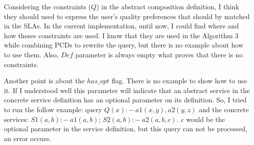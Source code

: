 \documentclass[12pt,a4paper,oneside]{report}
\begin{document}
\bigskip
Considering the constraints ($Q$) in the abstract composition definition, I think they should used to express the user's quality preferences that should by matched in the SLAs. In the current implementation, until now, I could find where and how theses constraints are used. I know that they are used in the Algorithm 3~\cite{ba} while combining PCDs to rewrite the query, but there is no example about how to use them. Also, \textbf{$Def$} parameter is always empty what proves that there is no constraints.

\bigskip
Another point is about the $has\_opt$ flag. There is no example to show how to use it. If I understood well this parameter will indicate that an abstract service in the concrete service definition has an optional parameter on its definition. So, I tried to run the follow example: query $Q(x) :-  \ a1(x,y),a2(y,z)$ and the concrete services: $S1(a,b) :- \ a1(a,b)$; $S2(a,b) :- \ a2(a,b,c)$. $c$ would be the optional parameter in the service definition, but this query can not be processed, an error occurs.

 

\end{document}
